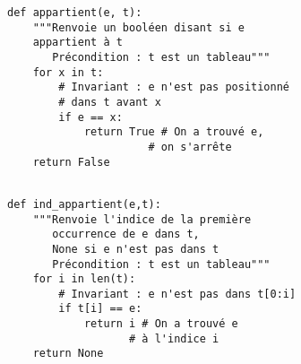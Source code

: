 
\begin{lstlisting}
def appartient(e, t):
    """Renvoie un booléen disant si e 
    appartient à t
       Précondition : t est un tableau"""
    for x in t:
        # Invariant : e n'est pas positionné 
        # dans t avant x
        if e == x:
            return True # On a trouvé e, 
                      # on s'arrête
    return False
 
\end{lstlisting}


\begin{lstlisting}
def ind_appartient(e,t):
    """Renvoie l'indice de la première 
       occurrence de e dans t,
       None si e n'est pas dans t
       Précondition : t est un tableau"""
    for i in len(t):
        # Invariant : e n'est pas dans t[0:i]
        if t[i] == e:
            return i # On a trouvé e 
                   # à l'indice i
    return None
\end{lstlisting}